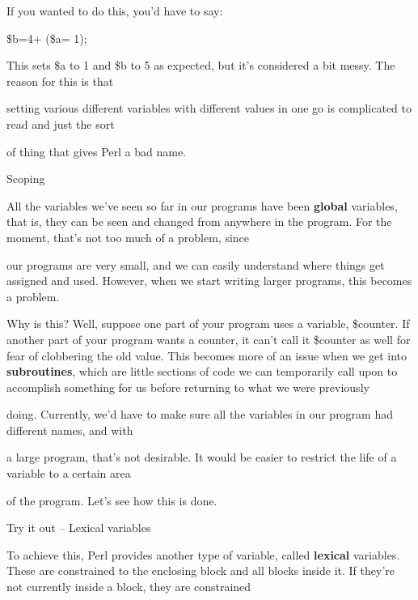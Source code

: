 \documentclass[a4paper,11pt]{book}
\begin{document}
\noindent 

\noindent 

\noindent If you wanted to do this, you'd have to say:

\noindent 

\noindent 

\noindent \$b=4+ (\$a= 1);

\noindent 

\noindent This sets \$a to 1 and \$b to 5 as expected, but it's considered a bit messy. The reason for this is that

\noindent setting various different variables with different values in one go is complicated to read and just the sort

\noindent of thing that gives Perl a bad name.

\noindent 

\noindent Scoping

\noindent 

\noindent All the variables we've seen so far in our programs have been \textbf{global }variables, that is, they can be seen and changed from anywhere in the program. For the moment, that's not too much of a problem, since

\noindent our programs are very small, and we can easily understand where things get assigned and used. However, when we start writing larger programs, this becomes a problem.

\noindent 

\noindent Why is this? Well, suppose one part of your program uses a variable, \$counter. If another part of your program wants a counter, it can't call it \$counter as well for fear of clobbering the old value. This becomes more of an issue when we get into \textbf{subroutines}, which are little sections of code we can temporarily call upon to accomplish something for us before returning to what we were previously

\noindent doing. Currently, we'd have to make sure all the variables in our program had different names, and with

\noindent a large program, that's not desirable. It would be easier to restrict the life of a variable to a certain area

\noindent of the program. Let's see how this is done.

\noindent 

\noindent Try it out -- Lexical variables

\noindent To achieve this, Perl provides another type of variable, called \textbf{lexical }variables. These are constrained to the enclosing block and all blocks inside it. If they're not currently inside a block, they are constrained
\end{document}
